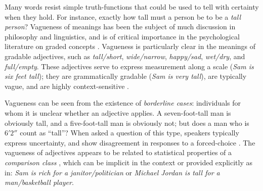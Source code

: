 \documentclass[12pt]{article}
\begin{document}
Many words resist simple truth-functions that could be used to tell with certainty when they hold. For instance, exactly how tall must a person be to be a \emph{tall person}?
Vagueness of meanings has been the subject of much discussion in philosophy and linguistics, and is of critical importance in the psychological literature on graded concepts \cite{rosch78,oshersonsmith81,armstrong83,kamppartee95,fodorlepore96,hampton07}. 
Vagueness is particularly clear in the meanings of gradable adjectives, such as \emph{tall/short}, \emph{wide/narrow}, \emph{happy/sad}, \emph{wet/dry}, and \emph{full/empty}. 
These adjectives serve to express measurement along a scale (\emph{Sam is six feet tall}); they are grammatically gradable (\emph{Sam is very tall}), are typically vague, and are highly context-sensitive \cite[e.g.~][]{kamp75,fine75,cresswell76,vonstechow84,williamson94,kennedymcnally05,kennedy07}. 

Vagueness can be seen from the existence of \emph{borderline cases}: individuals for whom it is unclear whether an adjective applies. A seven-foot-tall man is obviously tall, and a five-foot-tall man is obviously not; but does a man who is $6'2''$ count as ``tall''? When asked a question of this type, speakers typically express uncertainty, and show disagreement in responses to a forced-choice \citep{bonini99,schmidtetal09,verheyen10,alxatib11}. 
The vagueness of adjectives appears to be related to statistical properties of a \emph{comparison class} \citep{bierwisch89,schmidtetal09,solt11}, which can be implicit in the context or provided explicitly as in: 
\emph{Sam is rich for a janitor/politician} or \emph{Michael Jordan is tall for a man/basketball player}.
\end{document}
